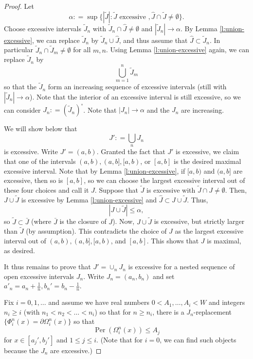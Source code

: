 \documentclass[12pt,twoside]{amsart}
\numberwithin{equation}{section}
\renewcommand{\leq}{\leqslant}
\renewcommand{\geq}{\geqslant}
\DeclareMathOperator{\Per}{Per}
\begin{document}
\begin{proof}
Let 
\[
\alpha : = \sup\{|\tilde J| : \tilde J \textrm{ excessive }, \hat J \cap \tilde J \not = \emptyset\}. 
\]
Choose excessive intervals $\tilde J_n$ with $\tilde J_n \cap \hat J \neq \emptyset$ and $|\tilde J_n|\to \alpha$. By Lemma \ref{l:union-excessive}, we can replace $\tilde J_n$ by $\tilde J_n \cup \hat J$, and thus assume that $\hat J \subset \tilde J_n$. In particular $\tilde J_n \cap \tilde J_m\neq \emptyset$ for all $m,n$. Using Lemma \ref{l:union-excessive} again, we can replace $\tilde J_n$ by
\[
\bigcup_{m=1}^n\tilde J_m
\]
so that the $\tilde J_n$ form an increasing sequence of excessive intervals (still with $|\tilde J_n| \to\alpha$). Note that the interior of an excessive interval is still excessive, so we can consider $J_n : = (\tilde J_n)^\circ$. Note that $|J_n| \to \alpha$ and the $J_n$ are increasing. 

We will show below that 
\[
J'  : = \bigcup_n J_n
\]
is excessive. Write $J' = (a,b)$. Granted the fact that $J'$ is excessive, we claim that one of the intervals $(a,b),(a,b],[a,b)$, or $[a,b]$ is the desired maximal excessive interval. Note that by Lemma \ref{l:union-excessive}, if $[a,b)$ and $(a,b]$ are excessive, then so is $[a,b]$, so we can choose the largest excessive interval out of these four choices and call it $J$. Suppose that $\tilde J$ is excessive with $\tilde J \cap J\not = \emptyset$. Then, $J \cup \tilde J$ is excessive by Lemma \ref{l:union-excessive} and $\hat J \subset J \cup\tilde J$. Thus, 
\[
|J \cup \tilde J| \leq \alpha,
\]
so $\tilde J \subset \bar J$ (where $\bar J$ is the closure of $J$). Now, $J \cup \tilde J$ is excessive, but strictly larger than $\tilde J$ (by assumption). This contradicts the choice of $J$ as the largest excessive interval out of $(a,b),(a,b],[a,b)$, and $[a,b]$. This shows that $J$ is maximal, as desired.

It thus remains to prove that $J' = \cup_n J_n$ is excessive for a nested sequence of open excessive intervals $J_n$. Write $J_n = (a_n,b_n)$ and set $a'_n = a_n + \frac 1n,b_n'=b_n - \frac 1n$. 





Fix $i =0,1,\dots$ and assume we have real numbers $0<A_1,\dots,A_i < W$ and integers $n_i\geq i$ (with $n_1< n_2<\dots<n_i$) so that for $n\geq n_i$, there is a $J_n$-replacement $\{\Phi^n_i(x)=\partial \Omega^n_i(x)\}$ so that 
\[
\Per(\Omega^n_i(x)) \leq A_j
\]
for $x \in [a_j',b_j']$ and $1 \leq j \leq i$. (Note that for $i=0$, we can find such objects because the $J_n$ are excessive.) 


\end{proof}
\end{document}
